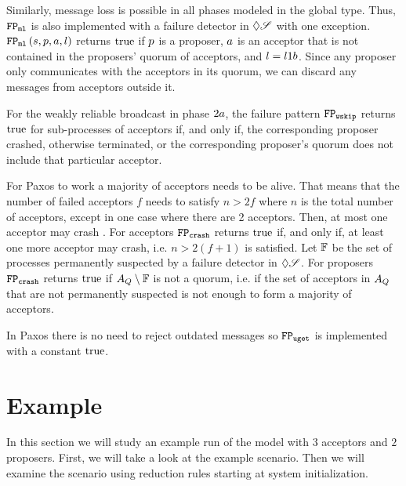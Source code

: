 Similarly, message loss is possible in all phases modeled in the global type.
Thus, $\mathtt{FP_{ml}}$ is also implemented with a failure detector in $\Diamond\mathscr{S}$ with one exception.
$\mathtt{FP_{ml}}\left(s,p,a,l\right)$ returns $\operatorname{true}$ if $p$ is a proposer, $a$ is an acceptor that is not contained in the proposers' quorum of acceptors, and $l = l1b$.
Since any proposer only communicates with the acceptors in its quorum, we can discard any messages from acceptors outside it.

For the weakly reliable broadcast in phase $2a$, the failure pattern $\mathtt{FP_{wskip}}$ returns $\operatorname{true}$ for sub-processes of acceptors if, and only if, the corresponding proposer crashed, otherwise terminated, or the corresponding proposer's quorum does not include that particular acceptor.

For Paxos to work a majority of acceptors needs to be alive.
That means that the number of failed acceptors $f$ needs to satisfy $n > 2f$ where $n$ is the total number of acceptors, except in one case where there are 2 acceptors.
Then, at most one acceptor may crash \cite{Lamport06}.
For acceptors $\mathtt{FP_{crash}}$ returns $\operatorname{true}$ if, and only if, at least one more acceptor may crash, i.e. $n > 2(f + 1)$ is satisfied.
Let $\mathbb{F}$ be the set of processes permanently suspected by a failure detector in $\Diamond\mathscr{S}$. For proposers $\mathtt{FP_{crash}}$ returns $\operatorname{true}$ if $A_Q\setminus\mathbb{F}$ is not a quorum, i.e. if the set of acceptors in $A_Q$ that are not permanently suspected is not enough to form a majority of acceptors.

In Paxos there is no need to reject outdated messages so $\mathtt{FP_{uget}}$ is implemented with a constant $\operatorname{true}$.


\section{Example}
In this section we will study an example run of the model with $3$ acceptors and $2$ proposers.
First, we will take a look at the example scenario.
Then we will examine the scenario using reduction rules starting at system initialization.

